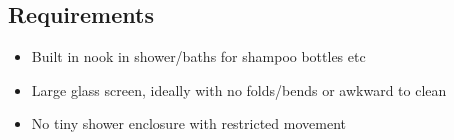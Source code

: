 \subsection{Requirements}
\begin{itemize}
\item Built in nook in shower/baths for shampoo bottles etc
\item Large glass screen, ideally with no folds/bends or awkward to clean
\item No tiny shower enclosure with restricted movement
\end{itemize}
